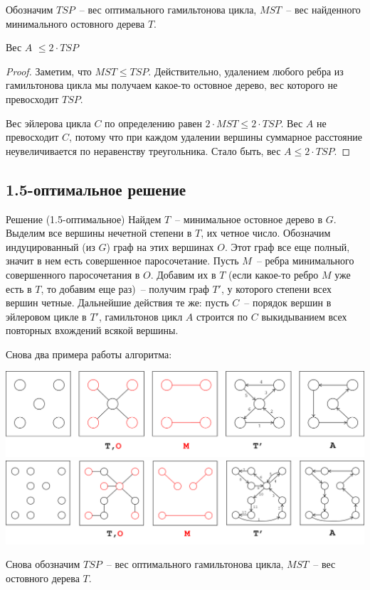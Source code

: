 Обозначим $TSP$~-- вес оптимального гамильтонова цикла, $MST$~-- вес найденного минимального остовного дерева $T$.
\begin{theorem*} Вес $A$ $\leq 2 \cdot TSP$ \end{theorem*}
\begin{proof}
Заметим, что $MST \leq TSP$. Действительно, удалением любого ребра из гамильтонова цикла мы получаем какое-то остовное дерево, вес которого не превосходит $TSP$.

Вес эйлерова цикла $C$ по определению равен $2\cdot MST \leq 2\cdot TSP$. Вес $A$ не превосходит $C$, потому что при каждом удалении вершины суммарное расстояние неувеличивается по неравенству треугольника. Стало быть, вес $A \leq 2 \cdot TSP$.
\end{proof}

\subsection{1.5-оптимальное решение}

\begin{algodescription}{Решение (1.5-оптимальное)}
    Найдем $T$~-- минимальное остовное дерево в $G$. Выделим все вершины нечетной степени в $T$, их четное число. Обозначим индуцированный (из $G$) граф на этих вершинах $O$. Этот граф все еще полный, значит в нем есть совершенное паросочетание. Пусть $M$~-- ребра минимального совершенного паросочетания в $O$. Добавим их в $T$ (если какое-то ребро $M$ уже есть в $T$, то добавим еще раз)~-- получим граф $T'$, у которого степени всех вершин четные. Дальнейшие действия те же: пусть $C$~-- порядок вершин в эйлеровом цикле в $T'$, гамильтонов цикл $A$ строится по $C$ выкидыванием всех повторных вхождений всякой вершины.
\end{algodescription}

Снова два примера работы алгоритма:

\begin{center}
\includegraphics[width=\textwidth]{figures/ex_shorthamil2.png} \\
\includegraphics[width=\textwidth]{figures/ex_longhamil2.png}
\end{center}
Снова обозначим $TSP$~-- вес оптимального гамильтонова цикла, $MST$~-- вес остовного дерева $T$.

